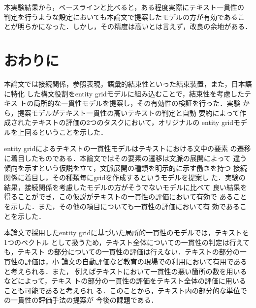 \documentclass[japanese]{jnlp_1.4}
\begin{document}
 本実験結果から，ベースラインと比べると，ある程度実際にテキスト一貫性の
 判定を行うような設定においても本論文で提案したモデルの方が有効であるこ
 とが明らかになった．しかし，その精度は高いとは言えず，改良の余地がある．



 \section{おわりに}

 本論文では接続関係，参照表現，語彙的結束性といった結束装置，また，日本語に特化
 した構文役割をentity gridモデルに組み込むことで，結束性を考慮したテキス
 トの局所的な一貫性モデルを提案し，その有効性の検証を行った．実験
 から，提案モデルがテキスト一貫性の高いテキストの判定と自動
 要約によって作成されたテキストの評価の2つのタスクにおいて，オリジナルの
 entity gridモデルを上回るということを示した．

 entity gridによるテキストの一貫性モデルはテキストにおける文中の要素
 の遷移に着目したものである．本論文ではその要素の遷移は文脈の展開によって
 違う傾向を示すという仮説を立て，文脈展開の種類を明示的に示す働きを持つ
 接続関係に着目し，その種類毎にgridを作成するというモデルを提案し
 た．実験の結果，接続関係を考慮したモデルの方がそうでないモデルに比べて
 良い結果を得ることができ，この仮説がテキストの一貫性の評価において有効で
 あることを示した．また，その他の項目についても一貫性の評価において有
 効であることを示した．

 本論文で採用したentity gridに基づいた局所的一貫性のモデルでは，テキストを1つのベクトル
 として扱うため，テキスト全体についての一貫性の判定は行えても，テキスト
 の部分についての一貫性の評価は行えない．テキストの部分の一貫性の評価は，小
 論文の自動評価など教育の現場での利用において有用であると考えられる．また，
 例えばテキストにおいて一貫性の悪い箇所の数を用いるなどによって，テキス
 トの部分の一貫性の評価をテキスト全体の評価に用いることも可能であると考えられ
 る．このことから，テキスト内の部分的な単位での一貫性の評価手法の提案が
 今後の課題である．
\end{document}
